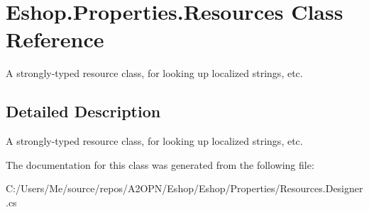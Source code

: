 \hypertarget{class_eshop_1_1_properties_1_1_resources}{}\section{Eshop.\+Properties.\+Resources Class Reference}
\label{class_eshop_1_1_properties_1_1_resources}


A strongly-\/typed resource class, for looking up localized strings, etc.  




\subsection{Detailed Description}
A strongly-\/typed resource class, for looking up localized strings, etc. 



The documentation for this class was generated from the following file\+:\begin{DoxyCompactItemize}
\item 
C\+:/\+Users/\+Me/source/repos/\+A2\+O\+P\+N/\+Eshop/\+Eshop/\+Properties/Resources.\+Designer.\+cs\end{DoxyCompactItemize}
